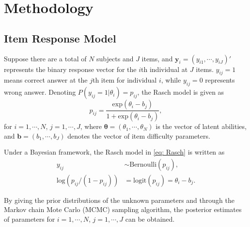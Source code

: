 \documentclass[12pt]{article}
\begin{document}
\section{Methodology}\label{sec:method}
\subsection{Item Response Model}
Suppose there are a total of $N$ subjects and $J$ items, and $\bm{y}_i = (y_{i1}, \cdots, y_{iJ})'$ represents the binary response vector for the $i$th individual at $J$ items. $y_{ij} = 1$ means correct answer at the $j$th item for individual $i$, while $y_{ij}=0$ represents wrong answer. Denoting $P(y_{ij} = 1|\theta_i) = p_{ij}$, the Rasch model \citep{rasch1960} is given as
\begin{equation} \label{eq: Rasch}
     p_{ij} = \frac{\text{exp}(\theta_i - b_j)}{1 + \text{exp}(\theta_i - b_j)},
\end{equation}
for $i = 1, \cdots, N$, $j = 1, \cdots, J$, where $\bm{\theta} = (\theta_1, \cdots, \theta_N)$ is the vector of latent abilities, and $\bm{b} = (b_1, \cdots, b_J)$ denotes the vector of item difficulty parameters. 

Under a Bayesian framework, the Rasch model in \eqref{eq: Rasch} is written as 
\begin{equation}
\begin{split}
		y_{ij} &\sim \text{Bernoulli}(p_{ij}),\\
	\text{log}(p_{ij}/(1-p_{ij})) &= \text{logit}(p_{ij}) = \theta_i - b_j.	
\end{split}
\label{eq:rasch_model}
\end{equation}


By giving the prior distributions of the unknown parameters and through the Markov chain Mote Carlo (MCMC) sampling algorithm, the posterior estimates of parameters for $i = 1, \cdots, N$, $j = 1, \cdots, J$ can be obtained.

%
\end{document}
